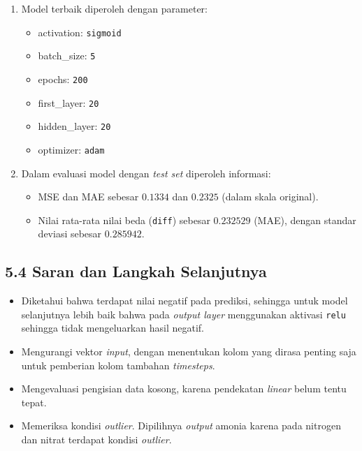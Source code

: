 \documentclass[11pt]{article}
\providecommand{\tightlist}{%
      \setlength{\itemsep}{0pt}\setlength{\parskip}{0pt}}
\begin{document}
\begin{enumerate}
\def\labelenumi{\arabic{enumi}.}
\tightlist
\item
  Model terbaik diperoleh dengan parameter:

  \begin{itemize}
  \tightlist
  \item
    activation: \texttt{sigmoid}
  \item
    batch\_size: \texttt{5}
  \item
    epochs: \texttt{200}
  \item
    first\_layer: \texttt{20}
  \item
    hidden\_layer: \texttt{20}
  \item
    optimizer: \texttt{adam}
  \end{itemize}
\item
  Dalam evaluasi model dengan \emph{test set} diperoleh informasi:

  \begin{itemize}
  \tightlist
  \item
    MSE dan MAE sebesar \(0.1334\) dan \(0.2325\) (dalam skala
    original).
  \item
    Nilai rata-rata nilai beda (\texttt{diff}) sebesar \(0.232529\)
    (MAE), dengan standar deviasi sebesar \(0.285942\).
  \end{itemize}
\end{enumerate}

    \hypertarget{saran-dan-langkah-selanjutnya}{%
\subsection{5.4 Saran dan Langkah
Selanjutnya}\label{saran-dan-langkah-selanjutnya}}

\begin{itemize}
\tightlist
\item
  Diketahui bahwa terdapat nilai negatif pada prediksi, sehingga untuk
  model selanjutnya lebih baik bahwa pada \emph{output layer}
  menggunakan aktivasi \texttt{relu} sehingga tidak mengeluarkan hasil
  negatif.
\item
  Mengurangi vektor \emph{input}, dengan menentukan kolom yang dirasa
  penting saja untuk pemberian kolom tambahan \emph{timesteps}.
\item
  Mengevaluasi pengisian data kosong, karena pendekatan \emph{linear}
  belum tentu tepat.
\item
  Memeriksa kondisi \emph{outlier}. Dipilihnya \emph{output} amonia
  karena pada nitrogen dan nitrat terdapat kondisi \emph{outlier}.
\end{itemize}
\end{document}
